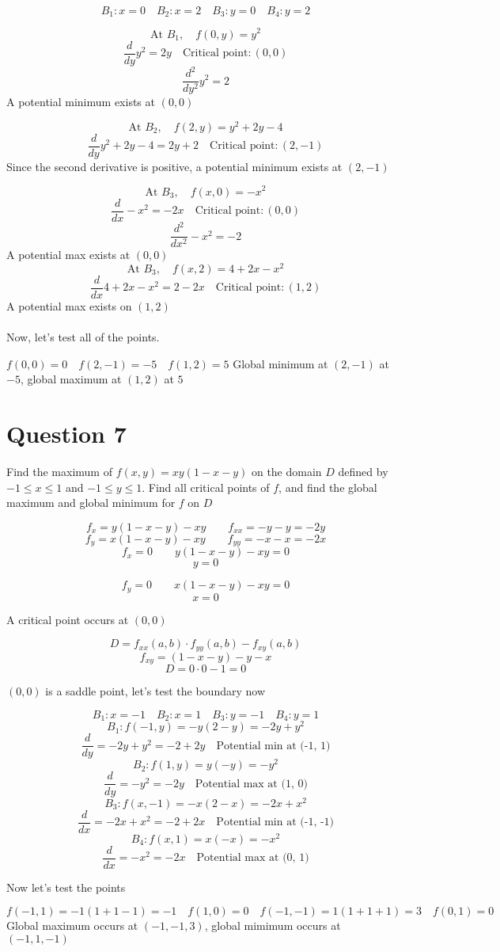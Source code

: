 \documentclass[hidelinks]{article}
\begin{document}
\[
B_1: x= 0 \quad B_2: x= 2 \quad B_3: y = 0 \quad B_4: y = 2 
\]

\[
	\text{At } B_1, \quad f(0, y)  = y^2
\]
\[
	\frac{d}{dy} y^2 = 2y \quad \text{Critical point} : (0, 0)
\]
\[
\frac{d^2}{dy^2} y^2 = 2  
\]
A potential minimum exists at $(0,0)$

\[
	\text{At } B_2, \quad f(2, y)  = y^2+2y - 4 
\]
\[
	\frac{d}{dy} y^2+2y-4 = 2y+2 \quad \text{Critical point} : (2, -1)
\]
Since the second derivative is positive, a potential minimum exists at $(2, -1)$

\[
	\text{At } B_3, \quad f(x, 0)  = -x^2 
\]
\[
	\frac{d}{dx} -x^2 = -2x \quad \text{Critical point} : (0, 0)
\]
\[
	\frac{d^2}{dx^2} -x^2 = -2
\]
A potential max exists at $(0, 0)$
\[
	\text{At } B_3, \quad f(x, 2)  = 4 + 2x -x^2  
\]
\[
	\frac{d}{dx} 4+2x-x^2 = 2-2x \quad \text{Critical point} : (1, 2)
\]
A potential max exists on $(1, 2)$
\\\\
Now, let's test all of the points. 

$f(0, 0) = 0 \quad f(2, -1) = -5 \quad f(1, 2) = 5$
Global minimum at $(2, -1)$ at $-5$, global maximum at $(1,2)$ at $5$

 


\newpage
\section{Question 7}
Find the maximum of $f(x, y) = xy(1-x-y)$ on the domain $D$ defined by $-1 \leq x \leq 1$ and $-1 \leq y \leq 1$. Find all critical points of $f$, and find the global maximum and global minimum for $f$ on $D$

\[
	f_x = y(1 - x -y) - xy \quad \quad f_{xx} = -y - y = -2y
\]
\[
	f_y = x(1-x-y) - xy \quad \quad f_{yy} = -x -x = -2x
\]
\[
	f_x = 0 \quad \quad y(1 - x -y) - xy = 0 
\]
\[
	y = 0 
\]

\[
	f_y = 0 \quad \quad x(1 - x - y) -xy = 0
\]
\[
	x = 0 
\]

A critical point occurs at $(0, 0)$

\[
	D = f_{xx}(a, b) \cdot f_{yy}(a, b) - f_{xy}(a, b)
\]
\[
	f_{xy} = (1-x-y) -y - x
\]
\[
	D = 0 \cdot 0 - 1 = 0
\]

$(0, 0)$ is a saddle point, let's test the boundary now

\[
	B_1: x = -1 \quad B_2: x = 1 \quad B_3: y = -1 \quad B_4: y = 1
\]
\[
	B_1: f(-1, y) = -y(2 - y) = -2y +y^2
\]
\[
	\frac{d}{dy}= -2y+ y^2 = -2 + 2y \quad \text{Potential min at (-1, 1)}
\]
\[
B_2: f(1, y) = y(- y) = -y^2
\]
\[
	\frac{d}{dy}= -y^2 = -2y \quad \text{Potential max at (1, 0)}
\]
\[
	B_3: f(x, -1) = -x(2 - x) = -2x +x^2
\]
\[
	\frac{d}{dx}= -2x+x^2 = -2 + 2x \quad \text{Potential min at (-1, -1)}
\]
\[
	B_4: f(x, 1) = x(-x) = -x^2
\]
\[
	\frac{d}{dx} =-x^2 = -2x \quad \text{Potential max at (0, 1)}
\]

Now let's test the points

\[
	f(-1, 1) = -1(1+1-1) = -1 \quad f(1, 0) = 0 \quad f(-1, -1) = 1(1 + 1 +1) = 3 \quad f(0, 1) = 0
\]
Global maximum occurs at $(-1, -1, 3)$, global mimimum occurs at $(-1, 1, -1)$
\end{document}

